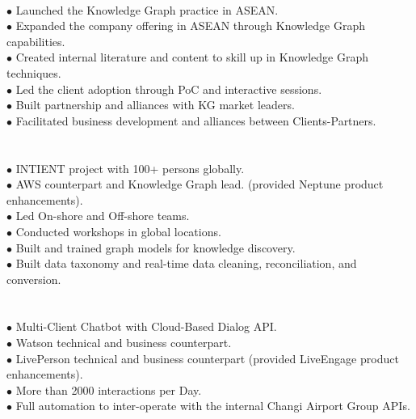 \documentclass[paper=a4,fontsize=11pt]{temp} %
\begin{document}
\hspace{3mm}
\begin{minipage}{0.04\linewidth}
    \hspace{\linewidth}
\end{minipage}
\begin{minipage}{0.86\linewidth}
\color{subheadings}{Knowledge Graph Practice Lead} \color{black}\\
$\bullet$ Launched the Knowledge Graph practice in ASEAN.\\
$\bullet$ Expanded the company offering in ASEAN through Knowledge Graph capabilities.\\
$\bullet$ Created internal literature and content to skill up in Knowledge Graph techniques.\\
$\bullet$ Led the client adoption through PoC and interactive sessions.\\
$\bullet$ Built partnership and alliances with KG market leaders.\\
$\bullet$ Facilitated business development and alliances between Clients-Partners.\\
\\
\color{subheadings}{Data Architect in Health Big Data Lake} \color{black}\\
$\bullet$ INTIENT project with 100+ persons globally.\\
$\bullet$ AWS counterpart and Knowledge Graph lead. (provided Neptune product enhancements).\\
$\bullet$ Led On-shore and Off-shore teams.\\
$\bullet$ Conducted workshops in global locations.\\
$\bullet$ Built and trained graph models for knowledge discovery.\\
$\bullet$ Built data taxonomy and real-time data cleaning, reconciliation, and conversion.\\
\\
\color{subheadings}{Technical Lead Chatbot Changi Airport Group} \color{black}\\
$\bullet$ Multi-Client Chatbot with Cloud-Based Dialog API. \\
$\bullet$ Watson technical and business counterpart.\\
$\bullet$ LivePerson technical and business counterpart (provided LiveEngage product enhancements).\\
$\bullet$ More than 2000 interactions per Day.\\
$\bullet$ Full automation to inter-operate with the internal Changi Airport Group APIs.\\


\end{minipage}
\end{document}
